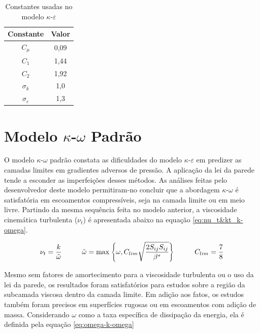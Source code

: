 \begin{table}[ht]
\centering
\caption[Constantes usadas no modelo $\kappa$-$\varepsilon$.]{Constantes usadas no modelo $\kappa$-$\varepsilon$ \cite{JONES1972301}}
\vspace{0.5cm}
\begin{tabular}{c|c}
 
Constante & Valor \\
\hline
$C_{\mu}$ & 0,09 \\
$C_{1}$ & 1,44 \\
$C_{2}$ & 1,92 \\
$\sigma_{k}$ & 1,0 \\
$\sigma_{\varepsilon}$ & 1,3

\end{tabular}
\label{tab:tabela-constantes-k-epsilon}
\end{table}

\section{Modelo \texorpdfstring{$\kappa$-$\omega$}{k-w} Padrão}

O modelo $\kappa$-$\omega$ padrão \cite{Wilcox1988ReassessmentOT,Wilcox2006,Wilcox2008} constata as dificuldades do modelo $\kappa$-$\varepsilon$ em predizer as camadas limites em gradientes adversos de pressão. A aplicação da lei da parede tende a esconder as imperfeições desses métodos. As análises feitas pelo desenvolvedor deste modelo permitiram-no concluir que a abordagem $\kappa$-$\omega$ é satisfatória em escoamentos compressíveis, seja na camada limite ou em meio livre. Partindo da mesma sequência feita no modelo anterior, a viscosidade cinemática turbulenta ($\nu_t$) é apresentada abaixo na equação \ref{eq:nu_t&kt_k-omega}.

\begin{equation}
    \nu_t = \frac{k}{\tilde{\omega}}
   	\hspace{1.0cm}
    \tilde{\omega} = \max{\left\lbrace \omega, C_{lim}\sqrt{\frac{2 S_{ij}S_{ij}}{\beta^*}}\right\rbrace}
    \hspace{1.0cm}
    C_{lim} = \frac{7}{8}
    \label{eq:nu_t&kt_k-omega}
\end{equation}

Mesmo sem fatores de amortecimento para a viscosidade turbulenta ou o uso da lei da parede, os resultados foram satisfatórios para estudos sobre a região da subcamada viscosa dentro da camada limite. Em adição aos fatos, os estudos também foram precisos em superfícies rugosas ou em escoamentos com adição de massa. Considerando $\omega$ como a taxa específica de dissipação da energia, ela é definida pela equação \ref{eq:omega-k-omega}


